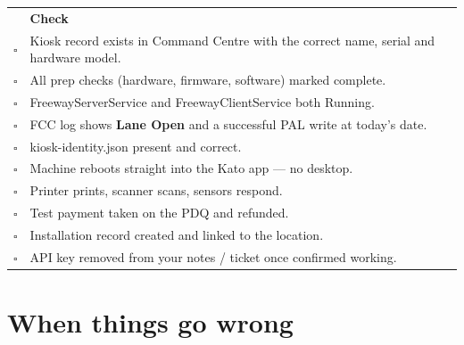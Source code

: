 \documentclass[a4paper,10pt]{article}
\newcommand{\wpath}[1]{{\ttfamily\small #1}}
\newcommand{\emptybox}{{\color{weknowgreyM}$\square$}}
\begin{document}
\begin{center}
\renewcommand{\arraystretch}{1.45}\small
\begin{tabularx}{\textwidth}{L{8mm} X}
\color{white} &
\color{white}\textbf{Check}\\
\emptybox & Kiosk record exists in Command Centre with the correct name,
serial and hardware model.\\
\emptybox & All prep checks (hardware, firmware, software) marked
complete.\\
\emptybox & \wpath{FreewayServerService} and \wpath{FreewayClientService}
both Running.\\
\emptybox & FCC log shows \textbf{Lane Open} and a successful PAL write
at today's date.\\
\emptybox & \wpath{kiosk-identity.json} present and correct.\\
\emptybox & Machine reboots straight into the Kato app --- no desktop.\\
\emptybox & Printer prints, scanner scans, sensors respond.\\
\emptybox & Test payment taken on the PDQ and refunded.\\
\emptybox & Installation record created and linked to the location.\\
\emptybox & API key removed from your notes / ticket once confirmed
working.\\
\end{tabularx}
\end{center}

\section{When things go wrong}\label{sec:trouble}
\end{document}
